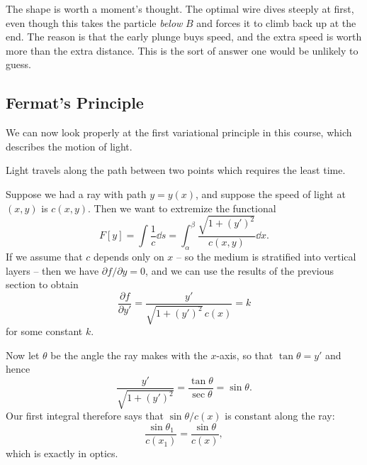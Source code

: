 \documentclass[a4paper]{scrartcl}
\begin{document}
\begin{example}
\begin{center}
	\end{center}

	The shape is worth a moment's thought. The optimal wire dives steeply at first, even though this takes the particle \emph{below} $B$ and forces it to climb back up at the end. The reason is that the early plunge buys speed, and the extra speed is worth more than the extra distance. This is the sort of answer one would be unlikely to guess.
\end{example}


\subsection{Fermat's Principle}\label{sec:fermat}

We can now look properly at the first variational principle in this course, which describes the motion of light.

\begin{law}
Light travels along the path between two points which requires the least time.
\end{law}

Suppose we had a ray with path $y = y(x)$, and suppose the speed of light at $(x, y)$ is $c(x, y)$. Then we want to extremize the functional
$$
F[y] = \int \frac{1}{c} \dd s = \int_{\alpha}^{\beta} \frac{\sqrt{1 + (y')^2}}{c(x, y)} \dd x.
$$
If we assume that $c$ depends only on $x$ -- so the medium is stratified into vertical layers -- then we have $\partial f /\partial y = 0$, and we can use the results of the previous section to obtain
$$
\frac{\partial f}{\partial y'} = \frac{y'}{\sqrt{1 + (y')^2}\, c(x)} = k
$$
for some constant $k$.

Now let $\theta$ be the angle the ray makes with the $x$-axis, so that $\tan\theta = y'$ and hence
$$
\frac{y'}{\sqrt{1 + (y')^2}} = \frac{\tan\theta}{\sec\theta} = \sin\theta.
$$
Our first integral therefore says that $\sin\theta / c(x)$ is constant along the ray:
$$
\frac{\sin \theta_1}{c(x_1)} = \frac{\sin \theta}{c(x)},
$$
which is exactly  in optics.
\end{document}
